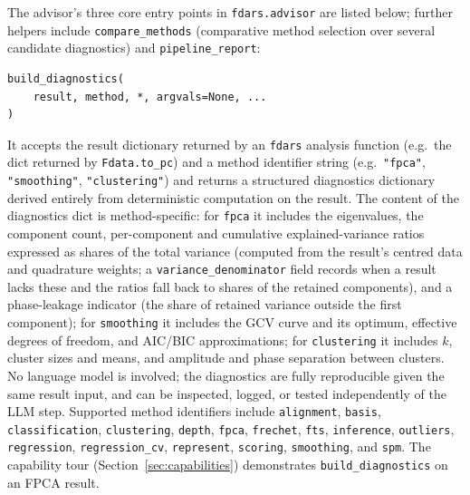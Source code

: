The advisor's three core entry points in \texttt{fdars.advisor} are listed
below; further helpers include \texttt{compare\_methods} (comparative method
selection over several candidate diagnostics) and \texttt{pipeline\_report}:

\begin{lstlisting}[style=fdarsinput]
build_diagnostics(
    result, method, *, argvals=None, ...
)
\end{lstlisting}
    It accepts the result dictionary
    returned by an \texttt{fdars} analysis function (e.g.\ the dict returned
    by \texttt{Fdata.to\_pc}) and a method identifier string (e.g.\
    \texttt{"fpca"}, \texttt{"smoothing"}, \texttt{"clustering"}) and
    returns a structured diagnostics dictionary derived entirely from
    deterministic computation on the result.  The content of the diagnostics
    dict is method-specific: for \texttt{fpca} it includes the eigenvalues,
    the component count, per-component and cumulative explained-variance
    ratios expressed as shares of the total variance (computed from the
    result's centred data and quadrature weights; a
    \texttt{variance\_denominator} field records when a result lacks these
    and the ratios fall back to shares of the retained components), and a
    phase-leakage indicator (the share of retained variance outside the first
    component); for \texttt{smoothing} it includes the GCV curve and its
    optimum, effective degrees of freedom, and AIC/BIC approximations; for
    \texttt{clustering} it includes $k$, cluster sizes and means, and
    amplitude and phase separation between clusters.  No
    language model is involved; the diagnostics are fully reproducible given
    the same result input, and can be inspected, logged, or tested
    independently of the LLM step.  Supported method identifiers include
    \texttt{alignment}, \texttt{basis}, \texttt{classification},
    \texttt{clustering}, \texttt{depth}, \texttt{fpca}, \texttt{frechet},
    \texttt{fts}, \texttt{inference}, \texttt{outliers}, \texttt{regression},
    \texttt{regression\_cv}, \texttt{represent}, \texttt{scoring},
    \texttt{smoothing}, and \texttt{spm}.  The capability tour
    (Section~\ref{sec:capabilities}) demonstrates \texttt{build\_diagnostics}
    on an FPCA result.

